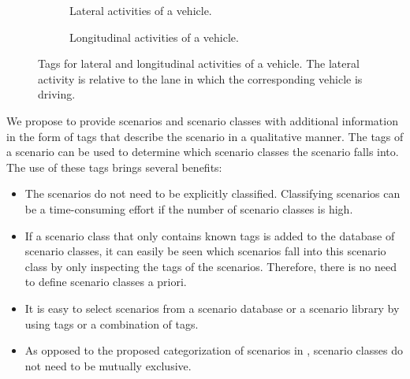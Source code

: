 \begin{figure}
	\centering
	\begin{subfigure}{\linewidth}
		\centering
		\caption{Lateral activities of a vehicle.\vspace{1em}}
		\label{fig:tree vehicle lat act}
	\end{subfigure}
	\begin{subfigure}{\linewidth}
		\centering
		\caption{Longitudinal activities of a vehicle.}
		\label{fig:tree vehicle long act}
	\end{subfigure}
	\caption{Tags for lateral and longitudinal activities of a vehicle. The lateral activity is relative to the lane in which the corresponding vehicle is driving.}
	\label{fig:tree vehicle activities}
\end{figure}

\cbstartc We propose to provide scenarios and scenario classes with additional information in the form of tags that describe the scenario in a qualitative manner.
The tags of a scenario can be used to determine which scenario classes the scenario falls into.
\cbend
The use of these tags brings several benefits:
\begin{itemize}
	\item The scenarios do not need to be explicitly classified. Classifying scenarios can be a time-consuming effort if the number of scenario classes is high.
	\item If a scenario class that only contains known tags is added to the database of scenario classes, it can easily be seen which scenarios fall into this scenario class by only inspecting the tags of the scenarios. Therefore, there is no need to define scenario classes a priori.
	\item It is easy to select scenarios from a scenario database or a scenario library by using tags or a combination of tags.
	\item As opposed to the proposed categorization of scenarios in \cite{opdencamp2014cats, USDoT2007precrashscenarios, lenard2011typical, lara2019harmonized}, scenario classes do not need to be mutually exclusive.
\end{itemize}

